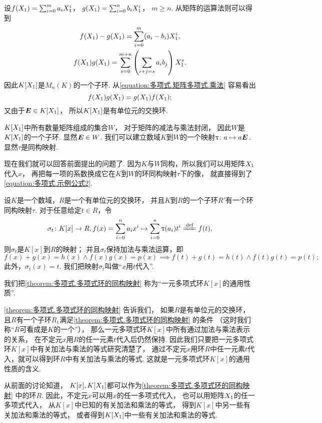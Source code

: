 设\(f(X_1)=\sum_{i=0}^m a_i X_1^i\)，
\(g(X_1)=\sum_{i=0}^n b_i X_1^i\)，
\(m \geq n\).
从矩阵的运算法则可以得到
\begin{gather}
	f(X_1)-g(X_1)
	= \sum_{i=0}^m (a_i - b_i) X_1^i, \\
	f(X_1) g(X_1)
	= \sum_{s=0}^{m+n} \left( \sum_{i+j=s} a_i b_j \right) X_1^s.
	\label{equation:多项式.矩阵多项式.乘法}
\end{gather}
因此\(K[X_1]\)是\(M_n(K)\)的一个子环.
从\cref{equation:多项式.矩阵多项式.乘法} 容易看出\[
	f(X_1) g(X_1) = g(X_1) f(X_1);
\]
又由于\(\boldsymbol{E} \in K[X_1]\)，
所以\(K[X_1]\)是有单位元的交换环.

\(K[X_1]\)中所有数量矩阵组成的集合\(W\)，
对于矩阵的减法与乘法封闭，
因此\(W\)是\(K[X_1]\)的一个子环.
显然\(\boldsymbol{E} \in W\).
我们可以建立数域\(K\)到\(W\)的一个映射\(\uptau\colon a \mapsto a \boldsymbol{E}\).
显然\(\tau\)是同构映射.

现在我们就可以回答前面提出的问题了.
因为\(K\)与\(W\)同构，所以我们可以用矩阵\(X_1\)代入\(x\)，
再把每一项的系数换成它在\(K\)到\(W\)的环同构映射\(\tau\)下的像，
就直接得到了\cref{equation:多项式.示例公式2}.

\begin{theorem}\label{theorem:多项式.多项式环的同构映射}
设\(K\)是一个数域，\(R\)是一个有单位元的交换环，
并且\(K\)到\(R\)的一个子环\(R'\)有一个环同构映射\(\tau\).
对于任意给定\(t \in R\)，令\[
	\sigma_t\colon
	K[x] \to R,
	f(x)=\sum_{i=0}^n a_i x^i \mapsto \sum_{i=0}^n \tau(a_i) t^i \defeq f(t),
\]
则\(\sigma_t\)是\(K[x]\)到\(R\)的映射；
并且\(\sigma_t\)保持加法与乘法运算，即\[
	f(x)+g(x)=h(x) \land f(x) g(x) = p(x)
	\implies
	f(t)+g(t)=h(t) \land f(t) g(t) = p(t);
\]
此外，\(\sigma_t(x) = t\).
我们把映射\(\sigma_t\)叫做“\(x\)用\(t\)代入”.
\end{theorem}

我们把\cref{theorem:多项式.多项式环的同构映射}
称为“一元多项式环\(K[x]\)的通用性质”.

\cref{theorem:多项式.多项式环的同构映射} 告诉我们，
如果\(R\)是有单位元的交换环，
且\(R\)有一个子环\(R_1\)满足\cref{theorem:多项式.多项式环的同构映射} 的条件
（这时我们称“\(R\)可看成是\(K\)的一个”），
那么一元多项式环\(K[x]\)中所有通过加法与乘法表示的关系，
在不定元\(x\)用\(R\)的任一元素\(t\)代入后仍然保持.
因此我们只要把一元多项式环\(K[x]\)中有关加法与乘法的等式研究清楚了，
通过不定元\(x\)用环\(R\)中任一元素\(t\)代入，就可以得到环\(R\)中有关加法与乘法的等式.
这就是一元多项式环\(K[x]\)的通用性质的含义.

从前面的讨论知道，
\(K[x],K[X_1]\)都可以作为\cref{theorem:多项式.多项式环的同构映射} 中的环\(R\).
因此，不定元\(x\)可以用\(x\)的任一多项式代入，
也可以用矩阵\(X_1\)的任一多项式代入，
从\(K[x]\)中已知的有关加法和乘法的等式，
得到\(K[x]\)中另一些有关加法和乘法的等式，
或者得到\(K[X_1]\)中一些有关加法和乘法的等式.

